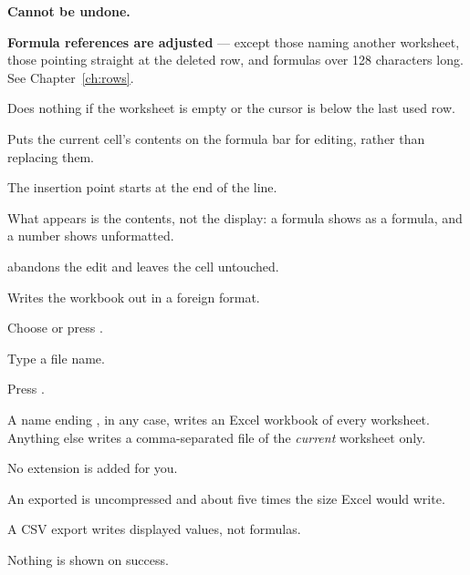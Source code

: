 \begin{ccsteps}
\item \textbf{Cannot be undone.}
\item \textbf{Formula references are adjusted} --- except those naming another
worksheet, those pointing straight at the deleted row, and formulas over 128
characters long. See Chapter~\ref{ch:rows}.
\item Does nothing if the worksheet is empty or the cursor is below the last
used row.
\end{ccsteps}


Puts the current cell's contents on the formula bar for editing, rather than
replacing them.

\begin{ccsteps}
\item The insertion point starts at the end of the line.
\item What appears is the contents, not the display: a formula shows as a
formula, and a number shows unformatted.
\item {} abandons the edit and leaves the cell untouched.
\end{ccsteps}


Writes the workbook out in a foreign format.

\begin{ccprocedure}[]
\item Choose  or press .
\item Type a file name.
\item Press .
\end{ccprocedure}

\begin{ccsteps}
\item A name ending , in any case, writes an Excel workbook of
every worksheet. Anything else writes a comma-separated file of the
\emph{current} worksheet only.
\item No extension is added for you.
\item An exported  is uncompressed and about five times the size
Excel would write.
\item A CSV export writes displayed values, not formulas.
\item Nothing is shown on success.
\end{ccsteps}


